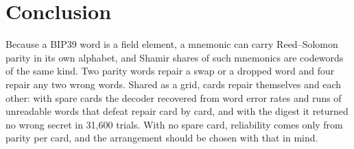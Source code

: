 \documentclass[numeric]{anvil-paper}
\begin{document}
\section{Conclusion}
\label{sec:conclusion}

Because a BIP39 word is a field element, a mnemonic can carry Reed--Solomon
parity in its own alphabet, and Shamir shares of such mnemonics are codewords
of the same kind. Two parity words repair a swap or a dropped word and four
repair any two wrong words. Shared as a grid, cards repair themselves and each
other: with spare cards the decoder recovered from word error rates and runs
of unreadable words that defeat repair card by card, and with the digest it
returned no wrong secret in 31{,}600 trials. With no spare card, reliability
comes only from parity per card, and the arrangement should be chosen with
that in mind.



\end{document}
